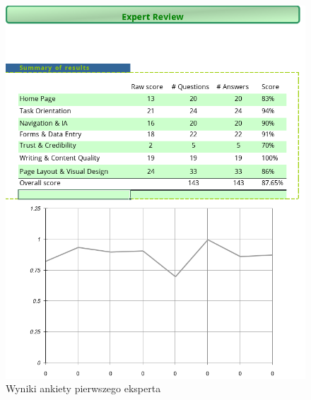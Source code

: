 \documentclass[inzynier,druk]{dyplom}
\begin{document}
\begin{figure}
	\centering\includegraphics[width=\textwidth]{img/ankieta1}
	\caption{Wyniki ankiety pierwszego eksperta}\label{rys:ankieta1}%
\end{figure}
\end{document}

